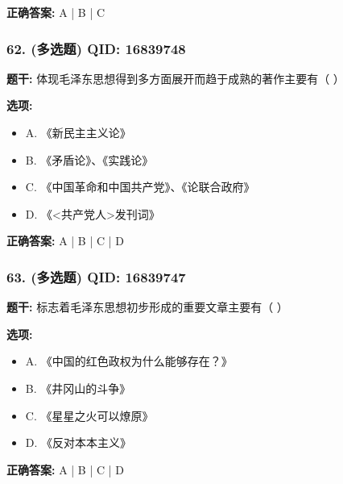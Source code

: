 \documentclass[12pt,UTF8]{ctexart}
\begin{document}
\textbf{正确答案:}
A | B | C

\vspace{0.3em}\hrulefill\vspace{0.7em}

\subsubsection*{62. (多选题) \small QID: 16839748}

\textbf{题干:}
体现毛泽东思想得到多方面展开而趋于成熟的著作主要有（ ）

\textbf{选项:}
\begin{itemize}[leftmargin=*]

  \item A. 《新民主主义论》

  \item B. 《矛盾论》、《实践论》

  \item C. 《中国革命和中国共产党》、《论联合政府》

  \item D. 《<共产党人>发刊词》

\end{itemize}

\textbf{正确答案:}
A | B | C | D

\vspace{0.3em}\hrulefill\vspace{0.7em}

\subsubsection*{63. (多选题) \small QID: 16839747}

\textbf{题干:}
标志着毛泽东思想初步形成的重要文章主要有（ ）

\textbf{选项:}
\begin{itemize}[leftmargin=*]

  \item A. 《中国的红色政权为什么能够存在？》

  \item B. 《井冈山的斗争》

  \item C. 《星星之火可以燎原》

  \item D. 《反对本本主义》

\end{itemize}

\textbf{正确答案:}
A | B | C | D
\end{document}
